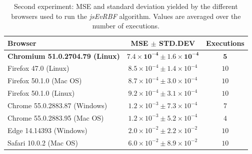 \documentclass{article}
\begin{document}
\newpage
\clearpage

\setlength{\tabcolsep}{10pt}
\begin{table}
\caption{Second experiment: MSE and standard deviation yielded by the different browsers used to run the {\em jsEvRBF} algorithm. Values are averaged over the number of executions\protect\footnotemark.}
\label{tab:results-per-browser-second-experiment}
\begin{center}
\begin{tabular}{p{4.5cm}cc}
{\bf Browser}	 & \bf{MSE} 	$\mathbf{\pm}$ {\bf STD.DEV}	 & 	{\bf Executions}	 \\
\hline
\bf Chromium 51.0.2704.79 (Linux)	 & 	$\mathbf{7.4\times10^{-4} \pm 	1.6 \times 10^{-4}}$	 & 	$\mathbf{5}$	 \\
Firefox 47.0 (Linux)	 & 	$8.5 \times 10^{-4}	 \pm 	1.4 \times 10^{-4}$	 & 	$10$	 \\
Firefox 50.1.0 (Mac OS)	 & 	$8.7 \times 10^{-4}	 \pm 	3.0 \times 10^{-4}$	 & 	$10$	 \\
Firefox 50.1.0 (Linux)	 & 	$9.2 \times 10^{-4}	 \pm 	3.1 \times 10^{-4}$	 & 	$10$	 \\
Chrome 55.0.2883.87 (Windows)	 & 	$1.2 \times 10^{-3}	 \pm 	7.3 \times 10^{-4}$	 & 	$7$	 \\
Chrome 55.0.2883.95 (Mac OS)	 & 	$1.2 \times 10^{-3}	 \pm 	5.2 \times 10^{-4}$	 & 	$4$	 \\
Edge 14.14393 (Windows)	 & 	$2.0 \times 10^{-2}	 \pm	2.2 \times 10^{-2}$	 & 	$10$	 \\
Safari 10.0.2 (Mac OS)	 & 	$6.0 \times 10^{-2}	\pm 	8.9 \times 10^{-2}$	 & 	$10$	 \\

\hline
\end{tabular}
\end{center}
\end{table}


\newpage
\clearpage
\end{document}
